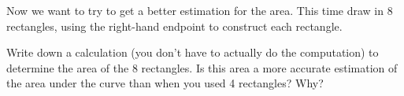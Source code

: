 \documentclass[11pt,fleqn]{article}
\begin{document}
\begin{adjustbox}{valign=t,minipage={.45\textwidth}}

\item Now we want to try to get a better estimation for the area. This time draw in 8 rectangles, using the {\sc right-hand endpoint} to construct each rectangle.

\end{adjustbox}
\begin{adjustbox}{valign=t,minipage={.45\textwidth}}
\begin{center}
\end{center}
\end{adjustbox}

Write down a calculation (you don't have to actually do the computation) to determine the area of the 8 rectangles. Is this area a more accurate estimation of the area under the curve than when you used 4 rectangles? Why?
\vfill
\end{document}
